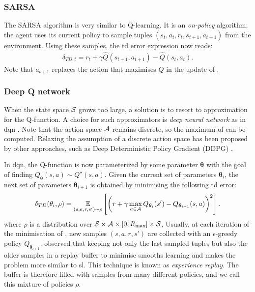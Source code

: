 \subsubsection{SARSA}
The SARSA \cite{rummery1994line} algorithm is very similar to Q-learning. 
It is an \emph{on-policy} algorithm; the agent uses its current policy to sample tuples $(s_t,a_t,r_t,s_{t+1},a_{t+1})$ from the environment.
Using these samples, the \gls{td} error expression now reads:
\begin{align*}
    \delta_{TD,t} = r_t+\gamma\hat Q(s_{t+1}, a_{t+1})-\hat Q(s_t, a_t).
\end{align*}
Note that $a_{t+1}$ replaces the action that maximises $Q$ in the update of .

\subsubsection{Deep Q network}
When the state space $\mathcal{S}$ grows too large, a solution is to resort to approximation for the Q-function. 
A choice for such approximators is \emph{deep neural network} as in \gls{dqn} \cite{mnih2013playing}.
Note that the action space $\mathcal{A}$ remains discrete, so the maximum of  can be computed.
Relaxing the assumption of a discrete action space has been proposed by other approaches, such as Deep Deterministic Policy Gradient (DDPG) \cite{lillicrap2015continuous}.

In \gls{dqn}, the Q-function is now parameterized by some parameter $\boldsymbol\theta$ with the goal of finding $Q_{\boldsymbol\theta}(s,a) \sim Q^\star(s,a)$. 
Given the current set of parameters $\boldsymbol\theta_i$, the next set of parameters $\boldsymbol\theta_{i+1}$ is obtained by minimising the following \gls{td} error:
\begin{align}
\label{eq:update_dqn}
    \delta_{TD}(\theta_i,\rho) = \operatorname*{\mathbb{E}}_{(s,a,r,s')\sim\rho}\left[\left(r+\gamma\max_{a\in\mathcal{A}}Q_{\boldsymbol\theta_{i}}(s') - Q_{\boldsymbol\theta_{i+1}}(s,a)\right)^2\right].
\end{align}
where $\rho$ is a distribution over $\mathcal{S}\times\mathcal{A}\times[0,{R_{\max}}]\times\mathcal{S}$. 
Usually, at each iteration of the minimisation of , new samples $(s,a,r,s')$ are collected with an $\epsilon$-greedy policy \wrt $Q_{\boldsymbol\theta_{i+1}}$. 
\cite{mnih2013playing} observed that keeping not only the last sampled tuples but also the older samples in a replay buffer to minimise  smooths learning and makes the problem more similar to \gls{sl}. This technique is known as \emph{experience replay}.
The buffer is therefore filled with samples from many different policies, and we call this mixture of policies $\rho$.

